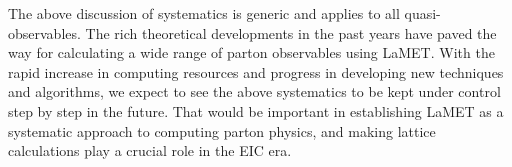 The above discussion of systematics is generic and applies to all quasi-observables. The rich theoretical developments in the past years have paved the way for calculating a wide range of parton observables using LaMET. With the rapid increase in computing resources and progress in developing new techniques and algorithms, we expect to see the above systematics to be kept under control step by step in the future. That would be important in establishing LaMET as a systematic approach to computing parton physics, and making lattice calculations play a crucial role in the EIC era.


